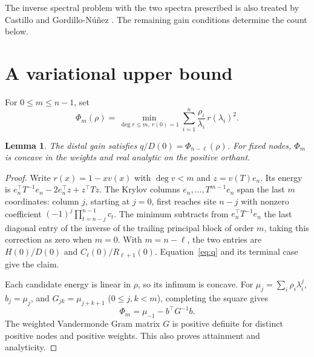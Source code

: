 \documentclass[11pt,a4paper]{article}
\newtheorem{lemma}[theorem]{Lemma}
\begin{document}
The inverse spectral problem with the two spectra prescribed is also treated
by Castillo and Gordillo-Núñez \cite[Lemmas~2.1, 3.1 and Theorem~3.1]{castillo}.
The remaining gain conditions determine the count below.

\section{A variational upper bound}
For \(0\le m\le n-1\), set
\begin{equation}\label{eq:phi}
 \Phi_m(\rho)=\min_{\deg r\le m,\ r(0)=1}
   \sum_{i=1}^n\frac{\rho_i}{\lambda_i}\,r(\lambda_i)^2 .
\end{equation}
\begin{lemma}\label{lem:phi}
The distal gain satisfies \(q/D(0)=\Phi_{n-\ell}(\rho)\).
For fixed nodes, \(\Phi_m\) is concave in the weights and real analytic on
the positive orthant.
\end{lemma}
\begin{proof}
Write \(r(x)=1-xv(x)\) with \(\deg v<m\) and \(z=v(T)e_n\). Its energy is
\(e_n^\top T^{-1}e_n-2e_n^\top z+z^\top Tz\). The Krylov columns
\(e_n,\ldots,T^{m-1}e_n\) span the last \(m\) coordinates: column \(j\),
starting at \(j=0\), first reaches site \(n-j\) with nonzero coefficient
\((-1)^j\prod_{t=n-j}^{n-1}c_t\). The minimum subtracts from
\(e_n^\top T^{-1}e_n\) the last diagonal entry of the inverse of the trailing
principal block of order \(m\), taking this correction as zero when \(m=0\).
With \(m=n-\ell\), the two entries are \(H(0)/D(0)\) and
\(C_\ell(0)/R_{\ell+1}(0)\). Equation~\eqref{eq:q} and its terminal case give the claim.

Each candidate energy is linear in \(\rho\), so its infimum is concave.
For \(\mu_j=\sum_i\rho_i\lambda_i^j\), \(b_j=\mu_j\), and
\(G_{jk}=\mu_{j+k+1}\) (\(0\le j,k<m\)), completing the square gives
\begin{equation}\label{eq:gram}
 \Phi_m=\mu_{-1}-b^\top G^{-1}b .
\end{equation}
The weighted Vandermonde Gram matrix \(G\) is positive definite for distinct
positive nodes and positive weights. This also proves attainment and analyticity.
\end{proof}
\end{document}
